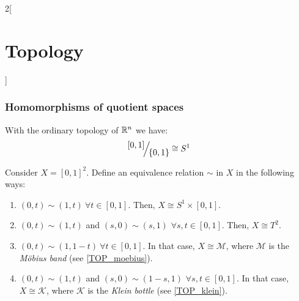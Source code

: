 \documentclass[../../../main.tex]{subfiles}
\begin{document}
\begin{multicols}{2}[\section{Topology}]
  \subsubsection{Homomorphisms of quotient spaces}
  \begin{prop}
    With the ordinary topology of $\mathbb{R}^n$ we have: $$\quot{[0,1]}{\{0,1\}}\cong S^1$$
  \end{prop}
  \begin{prop}\label{TOP_square-sim}
    Consider $X=[0,1]^2$. Define an equivalence relation $\sim$ in $X$ in the following ways:
    \begin{enumerate}
      \item $(0,t)\sim(1,t)\ \forall t\in[0,1]$. Then, $X\cong S^1\times [0,1]$.
      \item $(0,t)\sim(1,t)$ and $(s,0)\sim(s,1)$ $\forall s,t\in[0,1]$. Then, $X\cong T^2$.
      \item $(0,t)\sim(1,1-t)\ \forall t\in[0,1]$. In that case, $X\cong \mathcal{M}$, where $\mathcal{M}$ is the \textit{Möbius band} (see \cref{TOP_moebius}).
      \item $(0,t)\sim(1,t)$ and $(s,0)\sim(1-s,1)$ $\forall s,t\in[0,1]$. In that case, $X\cong \mathcal{K}$, where $\mathcal{K}$ is the \textit{Klein bottle} (see \cref{TOP_klein}).
    \end{enumerate}
    \begin{center}
      \begin{minipage}{\linewidth}
        \centering
        
      \end{minipage}
    \end{center}
  \end{prop}
  \begin{center}
    \begin{minipage}{\linewidth}
      \centering
      
      \label{TOP_moebius}
    \end{minipage}
  \end{center}
  \begin{center}
    \begin{minipage}{\linewidth}
      \centering
      

\end{minipage}
\end{center}
\end{multicols}
\end{document}
